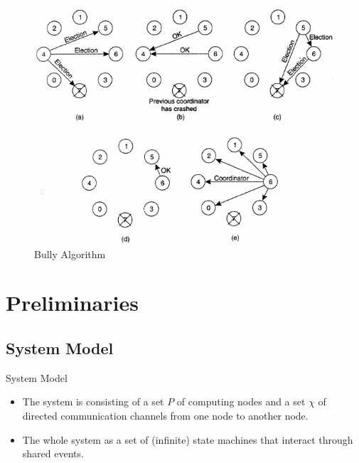 \documentclass{beamer}
\begin{document}
\begin{frame}
	\begin{figure}
		\centering
		\includegraphics[width=0.7\linewidth]{bully_algorithm}
		\caption{Bully Algorithm}
		\label{fig:bullyalgorithm}
	\end{figure}
\end{frame}
\fi
\section{Preliminaries}
\subsection{System Model}

\begin{frame}{System Model}

\begin{itemize}
	\item The system is consisting of a set $P$ of computing nodes and a set $\chi$ of directed communication channels from one node to another node.
	\item The whole system as a set of (infinite) state machines that interact through shared events.

\end{itemize}

\end{frame}
\end{document}
